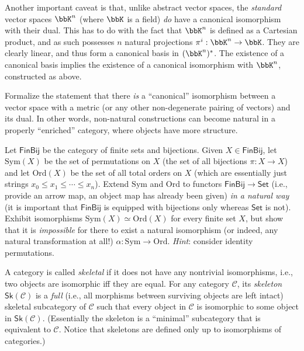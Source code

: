 \begin{example}
    Another important caveat is that, unlike abstract vector spaces, the \emph{standard} vector spaces $\bbK^n$ (where $\bbK$ is a field) \emph{do} have a canonical isomorphism with their dual. This has to do with the fact that $\bbK^n$ is defined as a Cartesian product, and as such possesses $n$ natural projections $\pi^i:\bbK^n\to \bbK$. They are clearly linear, and thus form a canonical basis in $(\bbK^n)^\ast$. The existence of a canonical basis implies the existence of a canonical isomorphism with $\bbK^n$, constructed as above.
\end{example}
%
\begin{xca}
    Formalize the statement that there \emph{is} a ``canonical'' isomorphism between a vector space with a metric (or any other non-degenerate pairing of vectors) and its dual. In other words, non-natural constructions can become natural in a properly ``enriched'' category, where objects have more structure.
\end{xca}
%
\begin{xca}
    Let $\mathsf{FinBij}$ be the category of finite sets and bijections. Given $X\in\mathsf{FinBij}$, let $\mathrm{Sym}(X)$ be the set of permutations on $X$ (the set of all bijections $\pi:X\to X$) and let $\mathrm{Ord}(X)$ be the set of all total orders on $X$ (which are essentially just strings $x_0\le x_1\le\cdots\le x_n$). Extend $\mathrm{Sym}$ and $\mathrm{Ord}$ to functors $\mathsf{FinBij}\to\mathsf{Set}$ (i.e., provide an arrow map, an object map has already been given) \emph{in a natural way} (it is important that $\mathsf{FinBij}$ is equipped with bijections only whereas $\mathsf{Set}$ is not). Exhibit isomorphisms $\mathrm{Sym}(X)\simeq\mathrm{Ord}(X)$ for every finite set $X$, but show that it is \emph{impossible} for there to exist a natural isomorphism (or indeed, any natural transformation at all!) $\alpha:\mathrm{Sym}\to\mathrm{Ord}$. \emph{Hint}: consider identity permutations.
\end{xca}
%
\begin{defn}[Skeleton]
    A category is called \emph{skeletal} if it does not have any nontrivial
    isomorphisms, i.e., two objects are isomorphic iff they are equal.
    For any category $\mathcal{C}$, its \emph{skeleton} $\mathsf{Sk}\left(\mathcal{C}\right)$
    is a \emph{full} (i.e., all morphisms between surviving objects are left intact) skeletal subcategory
    of $\mathcal{C}$ such that every object in $\mathcal{C}$ is isomorphic
    to some object in $\mathsf{Sk}\left(\mathcal{C}\right)$. (Essentially
    the skeleton is a ``minimal'' subcategory that is equivalent to
    $\mathcal{C}$. Notice that skeletons are defined only up to isomorphisms
    of categories.)
\end{defn}
